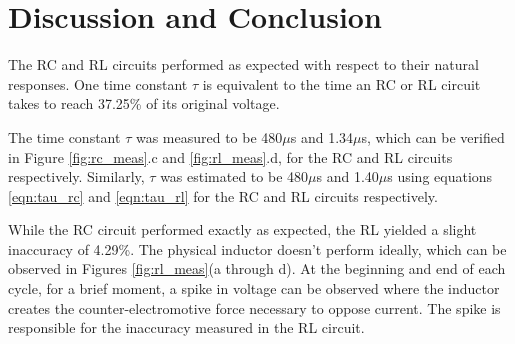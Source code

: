\documentclass[12pt]{article}
\begin{document}
\section{Discussion and Conclusion}\label{sec:d_and_c}
The RC and RL circuits performed as expected with respect to their natural responses. One time constant $\tau$ is equivalent to the time an RC or RL circuit takes to reach 37.25\% of its original voltage. 

The time constant $\tau$ was measured to be 480$\mu$s and 1.34$\mu$s, which can be verified in Figure \ref{fig:rc_meas}.c and \ref{fig:rl_meas}.d, for the RC and RL circuits respectively. Similarly, $\tau$ was estimated to be 480$\mu$s and 1.40$\mu$s using equations  \eqref{eqn:tau_rc} and  \eqref{eqn:tau_rl} for the RC and RL circuits respectively. 

While the RC circuit performed exactly as expected, the RL yielded a slight inaccuracy of 4.29\%. The physical inductor doesn't perform ideally, which can be observed in Figures  \ref{fig:rl_meas}(a through d). At the beginning and end of each cycle, for a brief moment, a spike in voltage can be observed where the inductor creates the counter-electromotive force necessary to oppose current. The spike is responsible for the inaccuracy measured in the RL circuit.

\pagebreak
\end{document}
